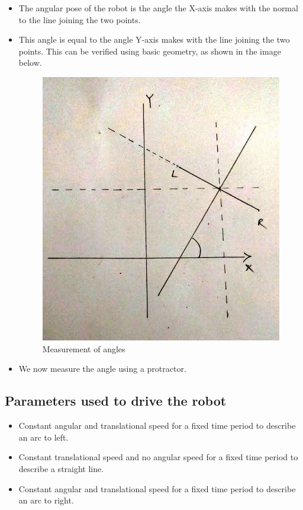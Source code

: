 \documentclass[10pt,a4paper]{article}
\begin{document}
{\begin{itemize}
\begin{itemize}
					\item The angular pose of the robot is the angle the X-axis makes with the normal to the line joining the two points.
					\item This angle is equal to the angle Y-axis makes with the line joining the two points. This can be verified using basic geometry, as shown in the image below.
					\begin{figure}[h]
						\centering
						\includegraphics[width=0.4\linewidth]{img/angles.jpeg}
						\caption{Measurement of angles}
						\label{fig:angGeometry}
					\end{figure}
					\item We now measure the angle using a protractor.
				\end{itemize}
		\end{itemize}
		}
	\subsection{Parameters used to drive the robot}
		\begin{itemize}
			\item Constant angular and translational speed for a fixed time period to describe an arc to left.
			\item Constant translational speed and no angular speed for a fixed time period to describe a straight line.
			\item Constant angular and translational speed for a fixed time period to describe an arc to right.
		\end{itemize}
\end{document}
